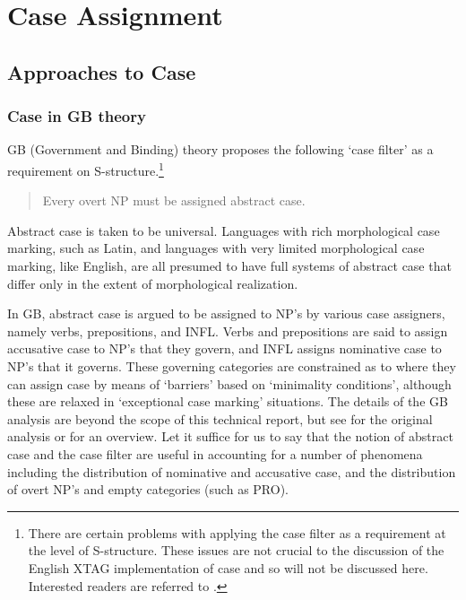 
\section{Case Assignment}
\label{case-assignment}
\subsection{Approaches to Case}
\subsubsection{Case in GB theory}

GB (Government and Binding) theory proposes the following
`case filter' as a requirement on S-structure.\footnote{There are certain
problems with applying the case filter as a requirement at the level of
S-structure.  These issues are not crucial to the discussion of the English
XTAG implementation of case and so will not be discussed here.  Interested
readers are referred to
\cite{lasnik-uriagereka88}.}

\begin{verse}
Every overt NP must be assigned abstract case. \cite{haegeman91}
\end{verse}

Abstract case is taken to be universal.  Languages with rich morphological case
marking, such as Latin, and languages with very limited morphological case
marking, like English, are all presumed to have full systems of abstract case
that differ only in the extent of morphological realization.

In GB, abstract case is argued to be assigned to NP's by various case
assigners, namely verbs, prepositions, and INFL.  Verbs and
prepositions are said to assign accusative case to NP's that they
govern, and INFL assigns nominative case to NP's that it governs.
These governing categories are constrained as to where they can assign
case by means of `barriers' based on `minimality conditions', although
these are relaxed in `exceptional case marking' situations.  The
details of the GB analysis are beyond the scope of this technical
report, but see \cite{chomsky86} for the original analysis or
\cite{haegeman91} for an overview.  Let it suffice for us to say that
the notion of abstract case and the case filter are useful in
accounting for a number of phenomena including the distribution of
nominative and accusative case, and the distribution of overt NP's and
empty categories (such as PRO).

